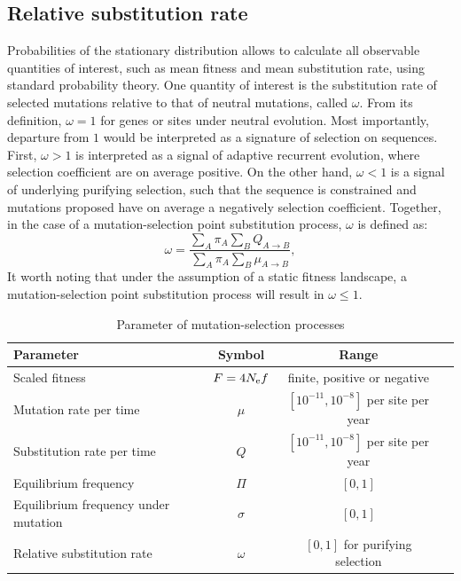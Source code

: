\subsection{Relative \gls{substitution} rate} 

Probabilities of the stationary distribution allows to calculate all observable quantities of interest, such as mean fitness and mean \gls{substitution} rate, using standard probability theory.
One quantity of interest is the \gls{substitution} rate of selected mutations relative to that of \gls{neutral} mutations, called $\omega$.
From its definition, $\omega=1$ for genes or sites under \gls{neutral} evolution.
Most importantly, departure from $1$ would be interpreted as a signature of selection on sequences. 
First, $\omega>1$ is interpreted as a signal of adaptive recurrent evolution, where selection coefficient are on average positive.
On the other hand, $\omega<1$ is a signal of underlying purifying selection, such that the sequence is constrained and mutations proposed have on average a negatively selection coefficient.
Together, in the case of a mutation-selection point \gls{substitution} process, $\omega$ is defined as:
\begin{equation}
\omega = \dfrac{ \sum_{A} \pi_{A} \sum_{B} Q_{A \to B}}{\sum_{A} \pi_{A}  \sum_{B} \mu_{A \to B}},
\end{equation}
It worth noting that under the assumption of a static fitness landscape, a mutation-selection point \gls{substitution} process will result in $\omega \leq 1$. 

\begin{table}[H]
	\begin{center}
		\begin{tabular}{|l|c|c|c|}
			\hline
			Parameter & Symbol & Range \\
			\hline
			Scaled fitness & $F=4 N_{\textrm{e}} f$ & finite, positive or negative \\
			Mutation rate per time & $\mu$ & $[10^{-11}, 10^{-8}]$ per site per year \\
			Substitution rate per time & $Q$ & $[10^{-11}, 10^{-8}]$ per site per year \\
			Equilibrium frequency & $\Pi$ & $[0, 1]$ \\
			Equilibrium frequency under mutation & $\sigma$ & $[0, 1]$ \\
			Relative \gls{substitution} rate & $\omega$ & $[0, 1]$ for purifying selection\\
			\hline
		\end{tabular}
	\end{center}
	\caption[Parameter of mutation-selection processes]{Parameter of mutation-selection processes}\label{table:params-mutsel}
\end{table}


